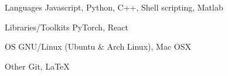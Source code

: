 

\begin{cvskills}

  \cvskill
    {Languages} %
    {Javascript, Python, C++, Shell scripting, Matlab} %

  \cvskill
    {Libraries/Toolkits} %
    {PyTorch, React} %

  \cvskill
    {OS} %
    {GNU/Linux (Ubuntu \& Arch Linux), Mac OSX} %

  \cvskill
    {Other} %
    {Git, \LaTeX} %
\end{cvskills}
